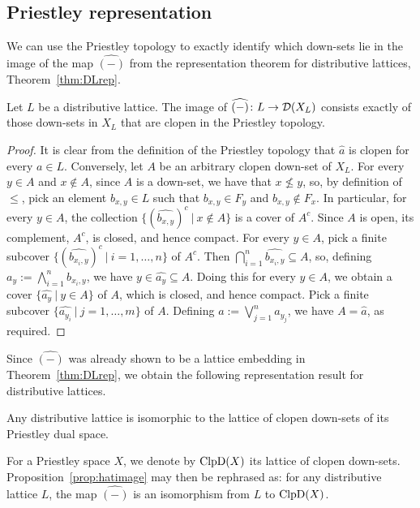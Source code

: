 \subsection*{Priestley representation}
We can use the Priestley topology to exactly identify which down-sets lie in the image of the map $\widehat{(-)}$ from the representation theorem for distributive lattices, Theorem~\ref{thm:DLrep}.
\begin{proposition}\label{prop:hatimage}
Let $L$ be a distributive lattice. The image of $\widehat{(-)} \colon L \to \mathcal{D}(X_L)$ consists exactly of those down-sets in $X_L$ that are clopen in the Priestley topology.
\end{proposition}
\begin{proof}
It is clear from the definition of the Priestley topology that $\widehat{a}$ is clopen for every $a \in L$. Conversely, let $A$ be an arbitrary clopen down-set of $X_L$. For every $y \in A$ and $x \not\in A$, since $A$ is a down-set, we have that $x \not\leq y$, so, by definition of $\leq$, pick an element $b_{x,y} \in L$ such that $b_{x,y} \in F_y$ and $b_{x,y} \not\in F_x$. In particular, for every $y \in A$, the collection $\{(\widehat{b_{x,y}})^c \ | \ x \not\in A\}$ is a cover of $A^c$. Since $A$ is open, its complement, $A^c$, is closed, and hence compact. For every $y \in A$, pick a finite subcover $\{(\widehat{b_{x_i,y}})^c \ | \ i = 1, \dots, n\}$ of $A^c$. Then $\bigcap_{i=1}^n \widehat{b_{x_i,y}} \subseteq A$, so, defining $a_y := \bigwedge_{i=1}^n b_{x_i,y}$, we have $y \in \widehat{a_y} \subseteq A$. Doing this for every $y \in A$, we obtain a cover $\{\widehat{a_y} \ | \ y \in A\}$ of $A$, which is closed, and hence compact. Pick a finite subcover $\{\widehat{a_{y_i}} \ | \ j = 1,\dots,m \}$ of $A$. Defining $a := \bigvee_{j=1}^n a_{y_j}$, we have $A = \widehat{a}$, as required.
\end{proof}

Since $\widehat{(-)}$ was already shown to be a lattice embedding in Theorem~\ref{thm:DLrep}, we obtain the following representation result for distributive lattices.
\begin{corollary}\label{cor:doubledualDL}
Any distributive lattice is isomorphic to the lattice of clopen down-sets of its Priestley dual space.
\end{corollary}

For a Priestley space $X$, we denote by $\mathrm{ClpD}(X)$ its lattice of clopen down-sets. Proposition~\ref{prop:hatimage} may then be rephrased as: for any distributive lattice $L$, the map $\widehat{(-)}$ is an isomorphism from $L$ to $\mathrm{ClpD}(X)$.

